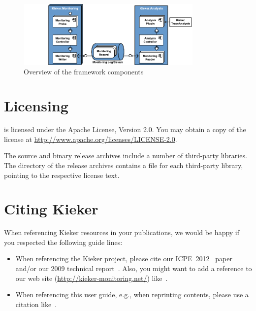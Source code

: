 		\begin{figure}[H]\centering
			\includegraphics[width=0.81\textwidth]{images/kiekerComponentDiagram-woCloud-bw-w-record-newNames-withTraceAnalysis-colors}
			
			\caption{Overview of the framework components}
			\label{fig:KiekerComponentDiagram}
		\end{figure}
	
	\section{Licensing}
		\Kieker{} is licensed under the Apache License, Version 2.0. You may obtain a copy of the license at \url{http://www.apache.org/licenses/LICENSE-2.0}.
		
		The \Kieker{} source and binary release archives include a number of third-party libraries. The  directory of the release archives contains a  file for each third-party library, pointing to the respective license text.
	
	\section{Citing Kieker}\label{sec:ch1:citingKieker}
		When referencing Kieker resources in your publications, we would be happy if you respected the following guide lines:

		\begin{itemize}
			\item 
			When referencing the Kieker project, please cite our ICPE~2012~\cite{KiekerICPE2012} paper and/or our 2009 technical report~\cite{vanHoornRohrHasselbringWallerEhlersFreyKieselhorst2009TRContinuousMonitoringOfSoftwareServicesDesignAndApplicationOfTheKiekerFramework}. Also, you might want to add a reference to our web site (\url{http://kieker-monitoring.net/}) like~\cite{KiekerWebSite}. 
			\item 
			When referencing this user guide, e.g., when reprinting contents, please use a citation like~\cite{Kieker1.7UserGuide}.
		\end{itemize}

